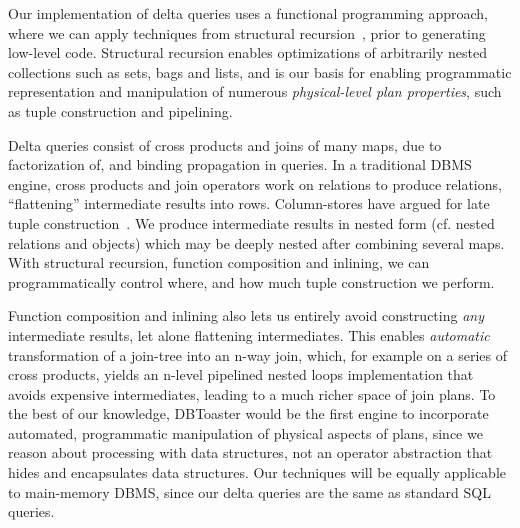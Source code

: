 Our implementation of delta queries uses a functional programming approach,
where we can apply techniques from structural
recursion~\cite{buneman-kleisli:95}, prior to generating low-level code.
Structural recursion enables optimizations of arbitrarily nested collections
such as sets, bags and lists, and is our basis for enabling programmatic
representation and manipulation of numerous \textit{physical-level plan
properties}, such as tuple construction and pipelining.

Delta queries consist of cross products and joins of many maps, due to
factorization of, and binding propagation in queries. In a traditional DBMS
engine, cross products and join operators work on relations to produce
relations, ``flattening'' intermediate results into rows. Column-stores have
argued for late tuple construction~\cite{abadi-icde:07}. We produce
intermediate results in nested form (cf. nested relations and objects) which may
be deeply nested after combining several maps. With structural recursion,
function composition and inlining, we can programmatically control where, and
how much tuple construction we perform.

Function composition and inlining also lets us entirely avoid constructing
\textit{any} intermediate results, let alone flattening intermediates. This
enables \textit{automatic} transformation of a join-tree into an n-way join,
which, for example on a series of cross products, yields an n-level pipelined
nested loops implementation that avoids expensive intermediates, leading to a
much richer space of join plans. To the best of our knowledge, DBToaster would
be the first engine to incorporate automated, programmatic manipulation of
physical aspects of plans, since we reason about processing with data
structures, not an operator abstraction that hides and encapsulates data
structures. Our techniques will be equally applicable to main-memory DBMS, since
our delta queries are the same as standard SQL queries.



